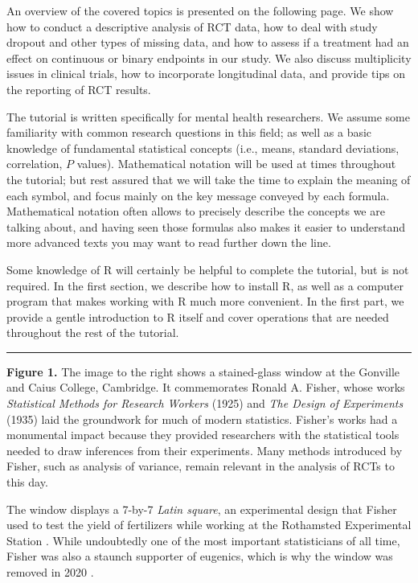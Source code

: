 An overview of the covered topics is presented on the following page. We show how to conduct a descriptive analysis of RCT data, how to deal with study dropout and other types of missing data, and how to assess if a treatment had an effect on continuous or binary endpoints in our study. We also discuss multiplicity issues in clinical trials, how to incorporate longitudinal data, and provide tips on the reporting of RCT results.

The tutorial is written specifically for mental health researchers. We assume some familiarity with common research questions in this field; as well as a basic knowledge of fundamental statistical concepts (i.e., means, standard deviations, correlation, $P$ values). Mathematical notation will be used at times throughout the tutorial; but rest assured that we will take the time to explain the meaning of each symbol, and focus mainly on the key message conveyed by each formula. Mathematical notation often allows to precisely describe the concepts we are talking about, and having seen those formulas also makes it easier to understand more advanced texts you may want to read further down the line.

Some knowledge of \textsf{R} will certainly be helpful to complete the tutorial, but is not required. In the first section, we describe how to install \textsf{R}, as well as a computer program that makes working with \textsf{R} much more convenient. In the first part, we provide a gentle introduction to \textsf{R} itself and cover operations that are needed throughout the rest of the tutorial. 

\vspace{0pt}

\par\noindent\rule{\textwidth}{0.4pt}

\footnotesize\noindent\textbf{Figure 1.} The image to the right shows a stained-glass window at the Gonville and Caius College, Cambridge. It commemorates Ronald A. Fisher, whose works \emph{Statistical Methods for Research Workers} (1925) and \emph{The Design of Experiments} (1935) laid the groundwork for much of modern statistics. Fisher's works had a monumental impact because they provided researchers with the statistical tools needed to draw inferences from their experiments. Many methods introduced by Fisher, such as analysis of variance, remain relevant in the analysis of RCTs to this day.

The window displays a 7-by-7 \emph{Latin square}, an experimental design that Fisher used to test the yield of fertilizers while working at the Rothamsted Experimental Station \citep{lehman-book}. While undoubtedly one of the most important statisticians of all time, Fisher was also a staunch supporter of eugenics, which is why the window was removed in 2020 \citep{guardian2020}.

